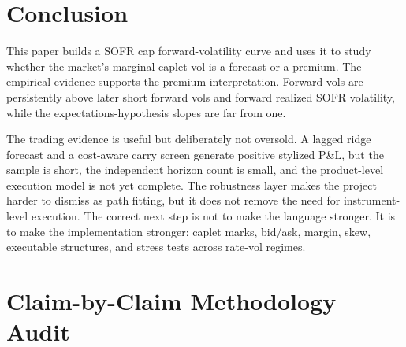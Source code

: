 \documentclass[12pt]{article}
\begin{document}
\section{Conclusion}

This paper builds a SOFR cap forward-volatility curve and uses it to study whether the market's
marginal caplet vol is a forecast or a premium. The empirical evidence supports the premium
interpretation. Forward vols are persistently above later short forward vols and forward realized
SOFR volatility, while the expectations-hypothesis slopes are far from one.

The trading evidence is useful but deliberately not oversold. A lagged ridge forecast and a
cost-aware carry screen generate positive stylized P\&L, but the sample is short, the independent
horizon count is small, and the product-level execution model is not yet complete. The robustness
layer makes the project harder to dismiss as path fitting, but it does not remove the need for
instrument-level execution. The correct next step is not to make the language stronger. It is to
make the implementation stronger: caplet marks, bid/ask, margin, skew, executable structures,
and stress tests across rate-vol regimes.

\appendix
\section{Claim-by-Claim Methodology Audit}
\end{document}
